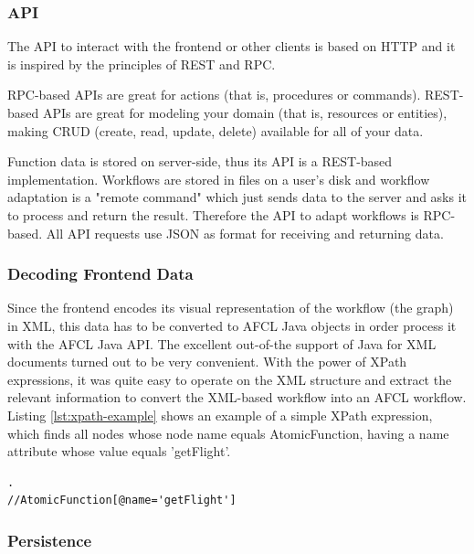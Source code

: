 \documentclass[a4paper,top=25mm,bottom=25mm,12pt,pdftex,halfparskip,twoside,bibtotoc,numbers=noenddot]{scrbook}
\begin{document}
\subsubsection{API}
 
The API to interact with the frontend or other clients is based on HTTP and it is inspired by the principles of REST and RPC.

RPC-based APIs are great for actions (that is, procedures or commands).
REST-based APIs are great for modeling your domain (that is, resources or entities), making CRUD (create, read, update, delete) available for all of your data. \cite{online-smashingmagazine-rest-vs-rpc}

Function data is stored on server-side, thus its API is a REST-based implementation. Workflows are stored in files on a user's disk and workflow adaptation is a "remote command" which just sends data to the server and asks it to process and return the result. Therefore the API to adapt workflows is RPC-based. All API requests use JSON as format for receiving and returning data.

\subsubsection{Decoding Frontend Data}
\label{sec:backend-decoding}

Since the frontend encodes its visual representation of the workflow (the graph) in XML, this data has to be converted to AFCL Java objects in order process it with the AFCL Java API.
The excellent out-of-the support of Java for XML documents turned out to be very convenient. With the power of XPath expressions, it was quite easy to operate on the XML structure and extract the relevant information to convert the XML-based workflow into an AFCL workflow. Listing \ref{lst:xpath-example} shows an example of a simple XPath expression, which finds all nodes whose node name equals \textsf{AtomicFunction}, having a \textsf{name} attribute whose value equals 'getFlight'.\\

\begin{lstlisting}[caption={Example of an XPath expression.},label={lst:xpath-example}].
//AtomicFunction[@name='getFlight']
\end{lstlisting}

\subsubsection{Persistence}
\label{sec:backend-persistence}
\end{document}
